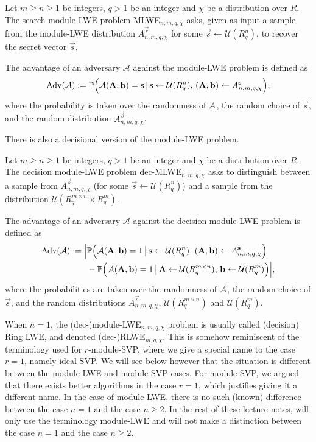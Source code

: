 \begin{definition}
Let $m \geq n \geq 1$ be integers, $q >1$ be an integer and $\chi$ be a distribution over $R$. The search module-LWE problem MLWE$_{n,m,q,\chi}$ asks, given as input a sample from the module-LWE distribution $A^{\vec s}_{n,m,q,\chi}$ for some $\vec s \leftarrow \mathcal{U}(R_q^n)$, to recover the secret vector $\vec s$.

The advantage of an adversary $\mathcal{A}$ against the module-LWE problem is defined as
\[ \operatorname{Adv}(\mathcal{A}) := \mathbb{P}\Big(\mathcal{A}(\mathbf A, \mathbf b) = \mathbf s\,|\, \mathbf s \leftarrow \mathcal{U}(R_q^n),\, (\mathbf A, \mathbf b) \leftarrow A^{\mathbf s}_{n,m,q,\chi}\Big), \]
where the probability is taken over the randomness of $\mathcal{A}$, the random choice of $\vec s$, and the random distribution $A^{\vec s}_{n,m,q,\chi}$.
\end{definition}

There is also a decisional version of the module-LWE problem.

\begin{definition}
Let $m \geq n \geq 1$ be integers, $q >1$ be an integer and $\chi$ be a distribution over $R$. The decision module-LWE problem dec-MLWE$_{n,m,q,\chi}$ asks to distinguish between a sample from $A^{\vec s}_{n,m,q,\chi}$ (for some $\vec s \leftarrow \mathcal{U}(R_q^n)$) and a sample from the distribution $\mathcal{U}(R_q^{m \times n} \times R_q^m)$.

The advantage of an adversary $\mathcal{A}$ against the decision module-LWE problem is defined as
\begin{align*} \operatorname{Adv}(\mathcal{A}) := \Big| &\mathbb{P}\Big(\mathcal{A}(\mathbf A, \mathbf b) = 1\,\big|\, \mathbf s \leftarrow \mathcal{U}(R_q^n),\, (\mathbf A, \mathbf b) \leftarrow A^{\mathbf s}_{n,m,q,\chi}\Big) \\
&- \mathbb{P}\Big(\mathcal{A}(\mathbf A, \mathbf b) = 1\,\big|\, \mathbf A \leftarrow \mathcal{U}(R_q^{m \times n}), \, \mathbf b \leftarrow \mathcal{U}(R_q^m)\Big) \Big|,
\end{align*}
where the probabilities are taken over the randomness of $\mathcal{A}$, the random choice of $\vec s$, and the random distributions $A^{\vec s}_{n,m,q,\chi}$, $\mathcal{U}(R_q^{m \times n})$ and $\mathcal{U}(R_q^m)$.
\end{definition}

When $n = 1$, the (dec-)module-LWE$_{n,m,q,\chi}$ problem is usually called (decision) Ring LWE, and denoted (dec-)RLWE$_{m,q,\chi}$.
This is somehow reminiscent of the terminology used for $r$-module-SVP, where we give a special name to the case $r = 1$, namely ideal-SVP.
We will see below however that the situation is different between the module-LWE and module-SVP cases. For module-SVP, we argued that there exists better algorithms in the case $r = 1$, which justifies giving it a different name. In the case of module-LWE, there is no such (known) difference between the case $n = 1$ and the case $n \geq 2$. In the rest of these lecture notes, will only use the terminology module-LWE and will not make a distinction between the case $n = 1$ and the case $n \geq 2$.

